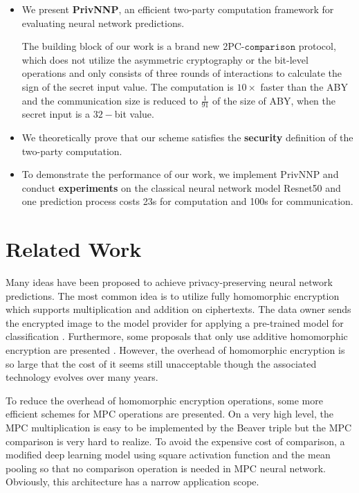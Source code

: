 \documentclass[letterpaper]{article} %
\begin{document}
    \begin{itemize}
        \item We present \textbf{PrivNNP}, an efficient two-party computation framework
        for evaluating neural network predictions.

        The building block of our work is a brand new 2PC-$\mathtt{comparison}$ protocol,
        which does not utilize the asymmetric cryptography or the bit-level operations
        and only consists of three rounds of interactions to calculate the sign of the secret input value.
        The computation is $10\times$ faster than the ABY \cite{ABY}
        and the communication size is reduced to $\frac{1}{91}$ of the size of ABY,
        when the secret input is a $32-$bit value.

        \item
        We theoretically prove that our scheme satisfies the
        \textbf{security} definition of the two-party computation.

        \item
        To demonstrate the performance of our work,
        we implement PrivNNP and conduct \textbf{experiments} on the classical
        neural network model Resnet50 and
        one prediction process costs 23s for computation and 100s for communication.

   \end{itemize}

\section{Related Work}
    Many ideas have been proposed to achieve privacy-preserving neural network predictions.
    The most common idea is to utilize fully homomorphic encryption  \cite{SEAL} \cite{Homomorphic1}
    which supports multiplication and addition on ciphertexts.
    The data owner sends the encrypted image to the model provider for applying a pre-trained model for classification \cite{FullyHomomorphic}.
    Furthermore, some proposals that only use additive homomorphic encryption are presented \cite{Homomorphic2}.
    However, the overhead of homomorphic encryption is so large that
    the cost of it seems still unacceptable
    though the associated technology evolves over many years\cite{ObliviousNeuralNetwork}.

    To reduce the overhead of homomorphic encryption operations,
    some more efficient schemes for MPC operations are presented.
    On a very high level, the MPC multiplication is easy to be implemented by the Beaver triple \cite{EfficientMultipartyProtocols}
    but the MPC comparison is very hard to realize.
    To avoid the expensive cost of comparison,
    a modified deep learning model \cite{CryptoNets} using square activation function and the mean pooling so that
    no comparison operation is needed in MPC neural network.
    Obviously, this architecture has a narrow application scope.
\end{document}
